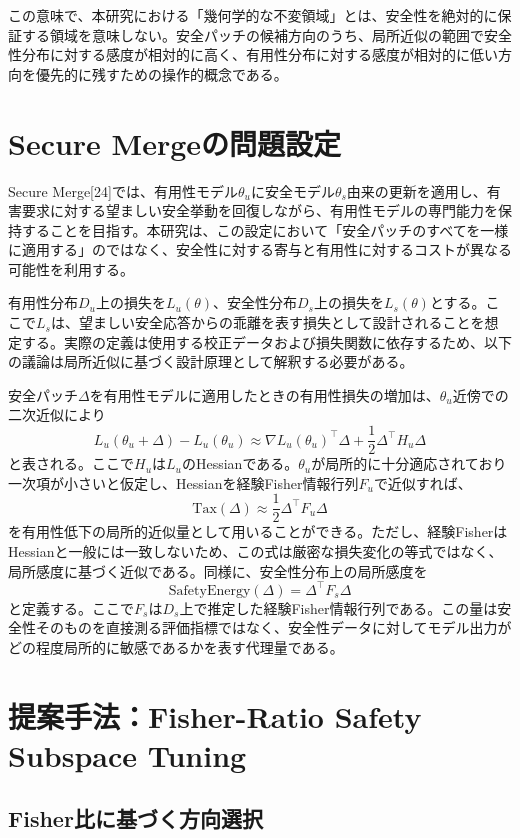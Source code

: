 \documentclass{article}
\begin{document}
この意味で、本研究における「幾何学的な不変領域」とは、安全性を絶対的に保証する領域を意味しない。安全パッチの候補方向のうち、局所近似の範囲で安全性分布に対する感度が相対的に高く、有用性分布に対する感度が相対的に低い方向を優先的に残すための操作的概念である。


\section{Secure Mergeの問題設定}
\label{app:secure-merge-formulation}

Secure Merge[24]では、有用性モデル\(\theta_u\)に安全モデル\(\theta_s\)由来の更新を適用し、有害要求に対する望ましい安全挙動を回復しながら、有用性モデルの専門能力を保持することを目指す。本研究は、この設定において「安全パッチのすべてを一様に適用する」のではなく、安全性に対する寄与と有用性に対するコストが異なる可能性を利用する。

有用性分布\(D_u\)上の損失を\(L_u(\theta)\)、安全性分布\(D_s\)上の損失を\(L_s(\theta)\)とする。ここで\(L_s\)は、望ましい安全応答からの乖離を表す損失として設計されることを想定する。実際の定義は使用する校正データおよび損失関数に依存するため、以下の議論は局所近似に基づく設計原理として解釈する必要がある。

安全パッチ\(\Delta\)を有用性モデルに適用したときの有用性損失の増加は、\(\theta_u\)近傍での二次近似により
\[
L_u(\theta_u+\Delta)-L_u(\theta_u)
\approx
\nabla L_u(\theta_u)^\top \Delta
+
\frac{1}{2}\Delta^\top H_u\Delta
\]
と表される。ここで\(H_u\)は\(L_u\)のHessianである。\(\theta_u\)が局所的に十分適応されており一次項が小さいと仮定し、Hessianを経験Fisher情報行列\(F_u\)で近似すれば、
\[
\mathrm{Tax}(\Delta)
\approx
\frac{1}{2}\Delta^\top F_u\Delta
\]
を有用性低下の局所的近似量として用いることができる。ただし、経験FisherはHessianと一般には一致しないため、この式は厳密な損失変化の等式ではなく、局所感度に基づく近似である。同様に、安全性分布上の局所感度を
\[
\mathrm{SafetyEnergy}(\Delta)
=
\Delta^\top F_s\Delta
\]
と定義する。ここで\(F_s\)は\(D_s\)上で推定した経験Fisher情報行列である。この量は安全性そのものを直接測る評価指標ではなく、安全性データに対してモデル出力がどの程度局所的に敏感であるかを表す代理量である。


\section{提案手法：Fisher-Ratio Safety Subspace Tuning}
\label{app:sst}

\subsection{Fisher比に基づく方向選択}
\end{document}
